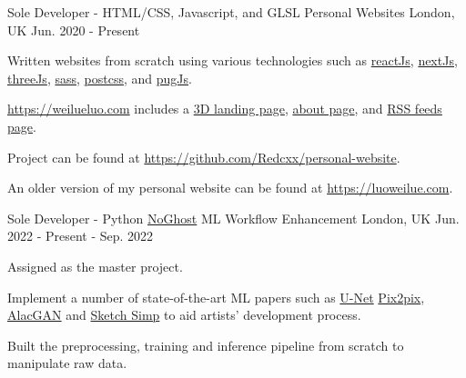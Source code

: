 

\begin{cventries}

  \cventry
    {Sole Developer - HTML/CSS, Javascript, and GLSL} %
    {Personal Websites} %
    {London, UK} %
    {Jun. 2020 - Present} %
    {
      \begin{cvitems} %
        \item {Written websites from scratch using various technologies such as \href{https://reactjs.org/}{reactJs}, \href{https://nextjs.org/}{nextJs}, \href{https://threejs.org/}{threeJs}, \href{https://sass-lang.com/}{sass},  \href{https://postcss.org/}{postcss}, and \href{https://pugjs.org/api/getting-started.html}{pugJs}.}
        \item {\href{https://weilueluo.com}{https://weilueluo.com} includes a \href{https://weilueluo.com}{3D landing page}, \href{https://weilueluo.com/about.html}{about page}, and \href{https://weilueluo.com/rss.html}{RSS feeds page}.}
        \item {Project can be found at \href{https://github.com/Redcxx/personal-website}{https://github.com/Redcxx/personal-website}.}
        \item {An older version of my personal website can be found at \href{https://luoweilue.com}{https://luoweilue.com}.}
      \end{cvitems}
    }

  \begin{cventries}
      \cventry
      {Sole Developer - Python} %
      {\href{https://www.noghost.co.uk/}{NoGhost} ML Workflow Enhancement} %
      {London, UK} %
      {Jun. 2022 - Present - Sep. 2022} %
      {
        \begin{cvitems} %
          \item {Assigned as the master project.}
          \item {Implement a number of state-of-the-art ML papers such as \href{https://arxiv.org/abs/1505.04597}{U-Net} \href{https://arxiv.org/pdf/1611.07004.pdf}{Pix2pix}, \href{https://arxiv.org/abs/1808.03240}{AlacGAN} and \href{https://esslab.jp/~ess/en/research/sketch/}{Sketch Simp} to aid artists' development process.}
          \item {Built the preprocessing, training and inference pipeline from scratch to manipulate raw data.}
        \end{cvitems}
      }
    

\end{cventries}
\end{cventries}
